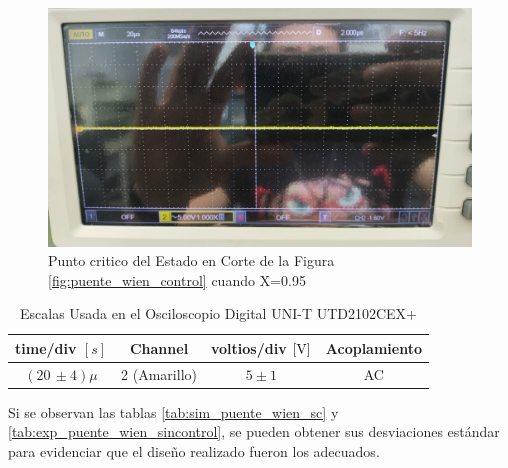             \begin{figure}[H]
                \centering
                \renewcommand{\figurename}{Imagen}
                \includegraphics[width=15cm]{Imagenes/exp_puente_wien_sc9.jpg}
                \caption{Punto critico del Estado en Corte de la Figura \ref{fig:puente_wien_control} cuando X=0.95}
                \label{fig:exp_puente_wien_sc9}
            \end{figure}

            \begin{table}[H]
                \centering
                \begin{tabular}{|c|c|c|c|}
                    \hline
                    \textbf{time/div} $[s]$ & \textbf{Channel} & \textbf{voltios/div $[\volt]$} & \textbf{Acoplamiento} \\ \hline
                    $(20 \, \pm 4) \mu  $ & 2 (Amarillo)  &   $5 \pm 1 $ & AC \\ \hline  
                \end{tabular}
                \caption{Escalas Usada en el Osciloscopio Digital UNI-T UTD2102CEX+}
                \label{tab:escala_puente_wien_sc9}
            \end{table}


            Si se observan las tablas \ref{tab:sim_puente_wien_sc} y \ref{tab:exp_puente_wien_sincontrol}, se pueden obtener sus desviaciones estándar para evidenciar que el diseño realizado fueron los adecuados.


